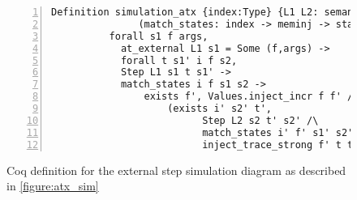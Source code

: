 \begin{figure}
\begin{lstlisting}[numbers=left] 
Definition simulation_atx {index:Type} {L1 L2: semantics}
               (match_states: index -> meminj -> state L1 -> state L2 -> Prop) :=
          forall s1 f args,
            at_external L1 s1 = Some (f,args) -> 
            forall t s1' i f s2, 
            Step L1 s1 t s1' ->
            match_states i f s1 s2 ->
             	exists f', Values.inject_incr f f' /\
                 	(exists i' s2' t',
                          Step L2 s2 t' s2' /\
                          match_states i' f' s1' s2' /\
                          inject_trace_strong f' t t') .
\end{lstlisting}


\caption[External step simulation diagram definition]{Coq definition for the external step simulation diagram as described in \cref{figure:atx_sim}}\label{code:atx_sim}
\end{figure}


%

%

